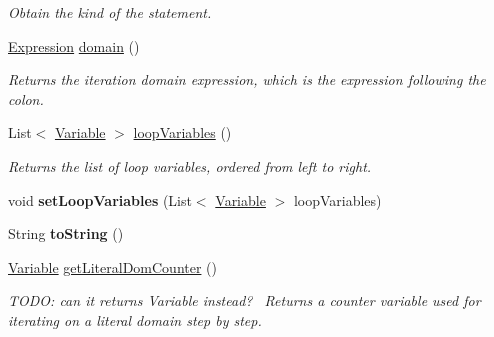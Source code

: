 \begin{DoxyCompactItemize}
\begin{DoxyCompactList}\small\item\em Obtain the kind of the statement. \end{DoxyCompactList}\item 
\hyperlink{interfaceedu_1_1udel_1_1cis_1_1vsl_1_1civl_1_1model_1_1IF_1_1expression_1_1Expression}{Expression} \hyperlink{classedu_1_1udel_1_1cis_1_1vsl_1_1civl_1_1model_1_1common_1_1statement_1_1CommonCivlForEnterStatement_a2cd214f06c7e29eb2fbb52892d0785c2}{domain} ()
\begin{DoxyCompactList}\small\item\em Returns the iteration domain expression, which is the expression following the colon. \end{DoxyCompactList}\item 
List$<$ \hyperlink{interfaceedu_1_1udel_1_1cis_1_1vsl_1_1civl_1_1model_1_1IF_1_1variable_1_1Variable}{Variable} $>$ \hyperlink{classedu_1_1udel_1_1cis_1_1vsl_1_1civl_1_1model_1_1common_1_1statement_1_1CommonCivlForEnterStatement_a3858731bfc99b10d69deb441f0f340b7}{loop\+Variables} ()
\begin{DoxyCompactList}\small\item\em Returns the list of loop variables, ordered from left to right. \end{DoxyCompactList}\item 
\hypertarget{classedu_1_1udel_1_1cis_1_1vsl_1_1civl_1_1model_1_1common_1_1statement_1_1CommonCivlForEnterStatement_af3a05831859569dffd1f855d8e47537c}{}void {\bfseries set\+Loop\+Variables} (List$<$ \hyperlink{interfaceedu_1_1udel_1_1cis_1_1vsl_1_1civl_1_1model_1_1IF_1_1variable_1_1Variable}{Variable} $>$ loop\+Variables)\label{classedu_1_1udel_1_1cis_1_1vsl_1_1civl_1_1model_1_1common_1_1statement_1_1CommonCivlForEnterStatement_af3a05831859569dffd1f855d8e47537c}

\item 
\hypertarget{classedu_1_1udel_1_1cis_1_1vsl_1_1civl_1_1model_1_1common_1_1statement_1_1CommonCivlForEnterStatement_a2131d7415aca0b01242b1356b6fbd6d9}{}String {\bfseries to\+String} ()\label{classedu_1_1udel_1_1cis_1_1vsl_1_1civl_1_1model_1_1common_1_1statement_1_1CommonCivlForEnterStatement_a2131d7415aca0b01242b1356b6fbd6d9}

\item 
\hyperlink{interfaceedu_1_1udel_1_1cis_1_1vsl_1_1civl_1_1model_1_1IF_1_1variable_1_1Variable}{Variable} \hyperlink{classedu_1_1udel_1_1cis_1_1vsl_1_1civl_1_1model_1_1common_1_1statement_1_1CommonCivlForEnterStatement_a780bee1c591a0333574cf92cff25726e}{get\+Literal\+Dom\+Counter} ()
\begin{DoxyCompactList}\small\item\em T\+O\+D\+O\+: can it returns Variable instead?~\newline
 Returns a counter variable used for iterating on a literal domain step by step. \end{DoxyCompactList}\end{DoxyCompactItemize}
